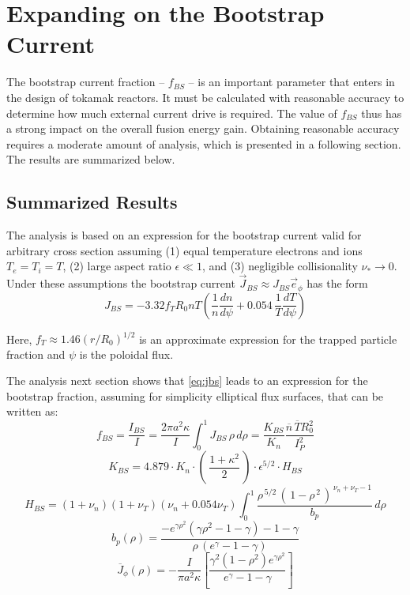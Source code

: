\chapter{Expanding on the Bootstrap Current}

\label{chapter:bootstrap}

The bootstrap current fraction -- $f_{BS}$ -- is an important parameter that enters in the design of tokamak reactors. It must be calculated with reasonable accuracy to determine how much external current drive is required. The value of $f_{BS}$ thus has a strong impact on the overall fusion energy gain. Obtaining reasonable accuracy requires a moderate amount of analysis, which is presented in a following section. The results are summarized below.

\section{Summarized Results}

The analysis is based on an expression for the bootstrap current valid for arbitrary cross section assuming (1) equal temperature electrons and ions $T_e = T_i = T$, (2) large aspect ratio $\epsilon \ll 1$, and (3) negligible collisionality $\nu_* \rightarrow 0$. Under these assumptions the bootstrap current $\vec J_{BS} \approx J_{BS} \vec e_\phi$ has the form
\begin{equation}
	\label{eq:jbs}
	J_{BS} = -3.32 f_T R_0 n T \left( \frac{1}{n} \frac{dn}{d\psi} + 0.054 \, \frac{1}{T} \frac{dT}{d\psi} \right)
\end{equation}

Here, $f_T \approx 1.46 ( r / R_0 )^{1/2}$ is an approximate expression for the trapped particle fraction and $\psi$ is the poloidal flux.

The analysis next section shows that \cref{eq:jbs} leads to an expression for the bootstrap fraction, assuming for simplicity elliptical flux surfaces, that can be written as:
\begin{equation}
	f_{BS} = \frac{I_{BS}}{I} = \frac{ 2 \pi a^2 \kappa }{I} \int_0^1 J_{BS} \, \rho \, d\rho = \frac{ K_{BS} }{ K_n } \frac{\overline n \, \overline T R_0^2}{I_P^2}
\end{equation}
\begin{equation}
  K_{BS} = 4.879 \cdot  K_n \cdot \left( \, \frac{1+\kappa^2}{2} \, \right) \cdot \epsilon^{5/2} \cdot H_{BS}
\end{equation}
\begin{equation}
  H_{BS} = ( 1 + \nu_n ) ( 1 + \nu_T ) ( \nu_n + 0.054 \nu_T ) \int_0^1 \frac{ \rho^{\,5/2} \, ( \, 1 - \rho^{\,2} \, )^{\, \nu_n + \nu_T - 1} }{b_p} \, d\rho
\end{equation}
\begin{equation}
	b_p(\rho) = \frac{ -e^{\gamma\rho^2} ( \gamma\rho^2 - 1 - \gamma ) - 1 - \gamma }{\rho \,( e^\gamma - 1 - \gamma ) }
\end{equation}
\begin{equation}
	\overline J_\phi (\rho ) = - \frac{ I }{ \pi a^2 \kappa } \left[ \frac{\gamma^2 ( 1 - \rho ^2 ) e^{\gamma \rho^2}}{e^\gamma - 1 - \gamma} \right]
\end{equation}

